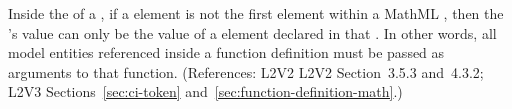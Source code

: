 Inside the  of a \FunctionDefinition, if a
 element is not the first element within a MathML
, then the 's value can only be the value
of a  element declared in that .  In
other words, all model entities referenced inside a function
definition must be passed as arguments to that function.
(References: L2V2
L2V2 Section~3.5.3 and~4.3.2; L2V3 Sections~\ref{sec:ci-token}
and~\ref{sec:function-definition-math}.)
